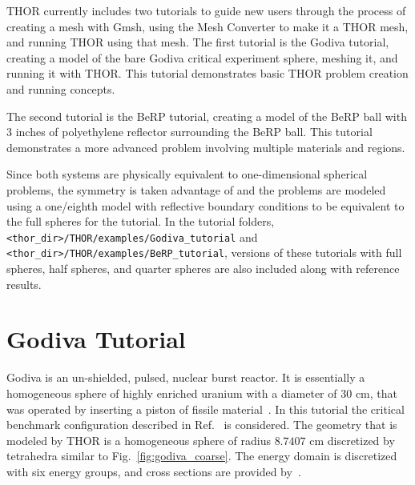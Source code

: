 THOR currently includes two tutorials to guide new users through the process of creating a mesh with Gmsh, using the Mesh Converter to make it a THOR mesh, and running THOR using that mesh.
The first tutorial is the Godiva tutorial, creating a model of the bare Godiva critical experiment sphere, meshing it, and running it with THOR.
This tutorial demonstrates basic THOR problem creation and running concepts.

The second tutorial is the BeRP tutorial, creating a model of the BeRP ball with 3 inches of polyethylene reflector surrounding the BeRP ball.
This tutorial demonstrates a more advanced problem involving multiple materials and regions.

Since both systems are physically equivalent to one-dimensional spherical problems, the symmetry is taken advantage of and the problems are modeled using a one/eighth model with reflective boundary conditions to be equivalent to the full spheres for the tutorial.
In the tutorial folders, \\
\verb"<thor_dir>/THOR/examples/Godiva_tutorial" and \verb"<thor_dir>/THOR/examples/BeRP_tutorial", versions of these tutorials with full spheres, half spheres, and quarter spheres are also included along with reference results.

\section{Godiva Tutorial}

Godiva is an un-shielded, pulsed, nuclear burst reactor. It is essentially a homogeneous sphere of highly enriched uranium with a diameter of $30$ cm, that was operated by inserting a piston of fissile material~\cite{Godiva1961}.
In this tutorial the critical benchmark configuration described in Ref.~\cite{GodivaBenchmark} is considered. The geometry that is modeled by THOR is a homogeneous sphere of radius $8.7407$ cm discretized by tetrahedra similar to Fig.~\ref{fig:godiva_coarse}.
The energy domain is discretized with six energy groups, and cross sections are provided by~\cite{GodivaBenchmark}.

